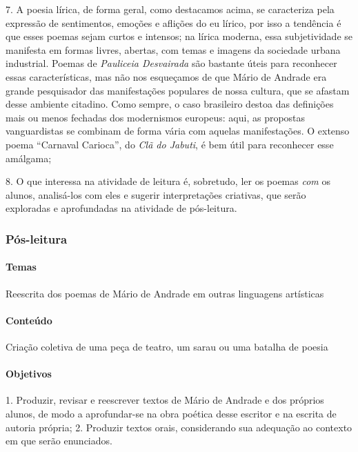 \documentclass[11pt]{extarticle}
\begin{document}
\vspace{3mm}

7. A poesia lírica, de forma geral, como destacamos acima, se
caracteriza pela expressão de sentimentos, emoções e aflições do eu
lírico, por isso a tendência é que esses poemas sejam curtos e intensos;
na lírica moderna, essa subjetividade se manifesta em formas livres,
abertas, com temas e imagens da sociedade urbana industrial. Poemas de
\emph{Pauliceia Desvairada} são bastante úteis para reconhecer essas
características, mas não nos esqueçamos de que Mário de Andrade era
grande pesquisador das manifestações populares de nossa cultura, que se
afastam desse ambiente citadino. Como sempre, o caso brasileiro destoa
das definições mais ou menos fechadas dos modernismos europeus: aqui, as
propostas vanguardistas se combinam de forma vária com aquelas
manifestações. O extenso poema ``Carnaval Carioca'', do \emph{Clã do
Jabuti}, é bem útil para reconhecer esse amálgama;

\vspace{3mm}

8. O que interessa na atividade de leitura é, sobretudo, ler os poemas
\emph{com} os alunos, analisá-los com eles e sugerir interpretações
criativas, que serão exploradas e aprofundadas na atividade de
pós-leitura.

\subsubsection{Pós-leitura}


\paragraph{Temas} Reescrita dos poemas de Mário de Andrade em outras
linguagens artísticas

\paragraph{Conteúdo} Criação coletiva de uma peça de teatro, um sarau ou
uma batalha de poesia

\paragraph{Objetivos} 1. Produzir, revisar e reescrever textos de Mário de
Andrade e dos próprios alunos, de modo a aprofundar-se na obra poética
desse escritor e na escrita de autoria própria; 2. Produzir textos
orais, considerando sua adequação ao contexto em que serão enunciados.
\end{document}
